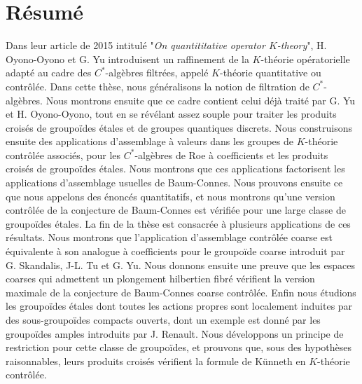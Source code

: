 \section*{Résumé}
Dans leur article de 2015 intitulé "\textit{On quantititative operator $K$-theory}", H. Oyono-Oyono et G. Yu introduisent un raffinement de la $K$-théorie opératorielle adapté au cadre des $C^*$-algèbres filtrées, appelé $K$-théorie quantitative ou contrôlée. Dans cette thèse, nous généralisons la notion de filtration de $C^*$-algèbres. Nous montrons ensuite que ce cadre contient celui déjà traité par G. Yu et H. Oyono-Oyono, tout en se révélant assez souple pour traiter les produits croisés de groupoïdes étales et de groupes quantiques discrets. Nous construisons ensuite des applications d'assemblage à valeurs dans les groupes de $K$-théorie contrôlée associés, pour les $C^*$-algèbres de Roe à coefficients et les produits croisés de groupoïdes étales. Nous montrons que ces applications factorisent les applications d'assemblage usuelles de Baum-Connes. Nous prouvons ensuite ce que nous appelons des énoncés quantitatifs, et nous montrons qu'une version contrôlée de la conjecture de Baum-Connes est vérifiée pour une large classe de groupoïdes étales. La fin de la thèse est consacrée à plusieurs applications de ces résultats. Nous montrons que l'application d'assemblage contrôlée coarse est équivalente à son analogue à coefficients pour le groupoïde coarse introduit par G. Skandalis, J-L. Tu et G. Yu. Nous donnons ensuite une preuve que les espaces coarses qui admettent un plongement hilbertien fibré vérifient la version maximale de la conjecture de Baum-Connes coarse contrôlée. Enfin nous étudions les groupoïdes étales dont toutes les actions propres sont localement induites par des sous-groupoïdes compacts ouverts, dont un exemple est donné par les groupoïdes amples introduits par J. Renault. Nous développons un principe de restriction pour cette classe de groupoïdes, et prouvons que, sous des hypothèses raisonnables, leurs produits croisés vérifient la formule de Künneth en $K$-théorie contrôlée.  

